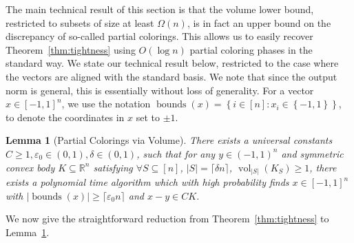 \documentclass[11pt]{article}
\newtheorem{lemma}[theorem]{Lemma}
\newcommand{\ceil}[1]{\lceil #1 \rceil}
\newcommand{\R}{{\mathbb{R}}}
\newcommand\eps{\varepsilon}
\newcommand{\set}[1]{\left\{ #1 \right\}}
\DeclareMathOperator{\vol}{vol}
\DeclareMathOperator{\bnds}{bounds}
\begin{document}
The main technical result of this section is that the volume lower bound,
restricted to subsets of size at least $\Omega(n)$, is in fact an upper bound on
the discrepancy of so-called partial colorings. This allows us to easily recover
Theorem~\ref{thm:tightness} using $O(\log n)$ partial coloring phases in the
standard way. We state our technical result below, restricted to the case where
the vectors are aligned with the standard basis. We note that since the output
norm is general, this is essentially without loss of generality. For a vector $x
\in [-1,1]^n$, we use the notation $\bnds(x) = \set{i \in [n]: x_i \in
\set{-1,1}}$, to denote the coordinates in $x$ set to $\pm 1$. 

\begin{lemma}[Partial Colorings via Volume] \label{lem:partial-via-volume}
There exists a universal constants $C \geq 1, \eps_0 \in (0,1), \delta \in (0,1)$, such that
for any $y \in (-1,1)^n$ and symmetric convex body $K \subseteq \R^n$ satisfying
$\forall S \subseteq [n]$, $|S| = \ceil{\delta n}$, $\vol_{|S|}(K_S) \geq 1$, there
exists a polynomial time algorithm which with high probability finds $x \in
[-1,1]^n$ with $|\bnds(x)| \geq \ceil{\eps_0 n}$ and
$x-y \in C K$.  
\end{lemma}

We now give the straightforward reduction from Theorem~\ref{thm:tightness} to
Lemma~\ref{lem:partial-via-volume}.
\end{document}
